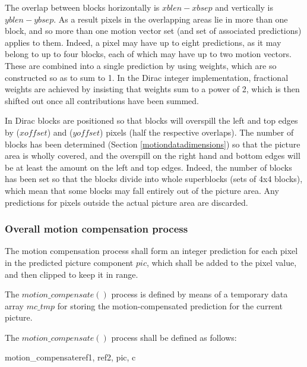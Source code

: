 \begin{informative*}
The overlap between blocks horizontally is $xblen - xbsep$ and vertically is
$yblen - ybsep$. As a result pixels in the overlapping areas lie in more than
one block, and so more than one motion vector set (and set of associated predictions)
applies to them. Indeed, a pixel may have up to eight predictions, as it may belong to
up to four blocks, each of which may have up to two motion vectors. These are combined
into a single prediction by using weights, which are so constructed so as to sum to 1. In the
 Dirac integer implementation, fractional weights are achieved by insisting that weights sum 
to a power of 2, which is then shifted out once all contributions have been summed.

In Dirac blocks are positioned so that blocks will overspill the left and top edges by 
($xoffset$) and ($yoffset$) pixels (half the respective overlaps).  The number of blocks has been
determined (Section \ref{motiondatadimensions}) so that the picture area is wholly covered, and the overspill
 on the right hand and bottom edges will be at least the amount on the left and top edges. 
Indeed, the number of blocks has been set so that the blocks divide into whole superblocks
(sets of 4x4 blocks), which mean that some blocks may fall entirely out of the picture area. 
 Any predictions for pixels outside the actual picture area are discarded.

\end{informative*}

\subsubsection{Overall motion compensation process}
\label{mcprocess}

The motion compensation process shall form an integer prediction for each pixel in 
the predicted picture component $pic$, which shall be added to the pixel value, and
 then clipped to keep it in range.

The $motion\_compensate()$ process is defined by means of a temporary data
array $mc\_tmp$ for storing the motion-compensated prediction for the 
current picture. 

The $motion\_compensate()$ process shall be defined as follows:

\begin{pseudo}{motion\_compensate}{ref1, ref2,  pic, c}
\bsELSE
\bsEND
{}
    \bsEND
\bsEND
{}
    \bsEND
\bsEND
\end{pseudo}

